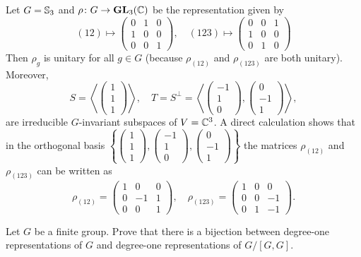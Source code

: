 \begin{example}
    Let $G=\mathbb{S}_3$ and $\rho\colon G\to\mathbf{GL}_3(\mathbb{C})$ be the representation given by
    \[
    (12)\mapsto\begin{pmatrix}
    0&1&0\\
    1&0&0\\
    0&0&1
    \end{pmatrix},\quad
    (123)\mapsto\begin{pmatrix}
    0&0&1\\
    1&0&0\\
    0&1&0
    \end{pmatrix}
    \]
    Then $\rho_g$ is unitary for all $g\in G$ (because $\rho_{(12)}$ and $\rho_{(123)}$ are both
    unitary). Moreover,
    \[
    S=\left\langle \begin{pmatrix}
    1\\1\\1
    \end{pmatrix}
    \right\rangle,
    \quad
    T=S^{\perp}=\left\langle
    \begin{pmatrix}
    -1\\1\\0
    \end{pmatrix},
    \begin{pmatrix}
    0\\-1\\1
    \end{pmatrix}
    \right\rangle,
    \]
    are irreducible $G$-invariant subspaces of $V=\mathbb{C}^3$. A direct calculation shows that
    in the orthogonal basis $\left\{\begin{pmatrix}
    1\\1\\1
    \end{pmatrix},
    \begin{pmatrix}
    -1\\1\\0
    \end{pmatrix},
    \begin{pmatrix}
    0\\-1\\1
    \end{pmatrix}
    \right\}$
    the matrices $\rho_{(12)}$ and $\rho_{(123)}$ can be written as
    \[
    \rho_{(12)}=\begin{pmatrix}
        1&0&0\\
        0&-1&1\\
        0&0&1
    \end{pmatrix},
    \quad
    \rho_{(123)}=
    \begin{pmatrix}
        1&0&0\\
        0&0&-1\\
        0&1&-1
    \end{pmatrix}.
    \]
\end{example}

\begin{exercise}
Let $G$ be a finite group.
Prove that there is a bijection between degree-one representations of $G$ and
degree-one representations of $G/[G,G]$.
\end{exercise}

